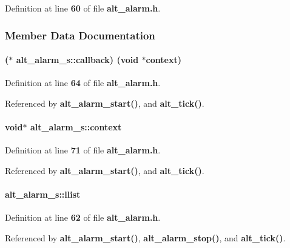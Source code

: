 Definition at line {\bf 60} of file {\bf alt\+\_\+alarm.\+h}.



\subsubsection{Member Data Documentation}
\paragraph[{callback}]{($\ast$ alt\+\_\+alarm\+\_\+s\+::callback) (void $\ast${\bf context})}\label{structalt__alarm__s_a4774124b3079e4f68c472e909dd3dbf5}


Definition at line {\bf 64} of file {\bf alt\+\_\+alarm.\+h}.



Referenced by {\bf alt\+\_\+alarm\+\_\+start()}, and {\bf alt\+\_\+tick()}.

\paragraph[{context}]{\setlength{\rightskip}{0pt plus 5cm}void$\ast$ alt\+\_\+alarm\+\_\+s\+::context}\label{structalt__alarm__s_a1a2571d1dc973f0012d0391bc46ce3a9}


Definition at line {\bf 71} of file {\bf alt\+\_\+alarm.\+h}.



Referenced by {\bf alt\+\_\+alarm\+\_\+start()}, and {\bf alt\+\_\+tick()}.

\paragraph[{llist}]{ alt\+\_\+alarm\+\_\+s\+::llist}\label{structalt__alarm__s_a5eace0d8976316500da0a64ad3a2e58e}


Definition at line {\bf 62} of file {\bf alt\+\_\+alarm.\+h}.



Referenced by {\bf alt\+\_\+alarm\+\_\+start()}, {\bf alt\+\_\+alarm\+\_\+stop()}, and {\bf alt\+\_\+tick()}.

